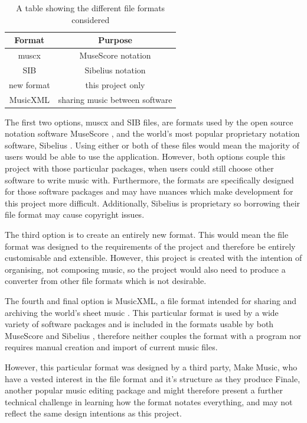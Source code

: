 \begin{table}[H]
\centering
\begin{tabular}{| c | c | } \hline
  {Format} & {Purpose} \\ \hline
  muscx & MuseScore notation \\ \hline
  SIB & Sibelius notation \\ \hline
  new format & this project only \\ \hline
  MusicXML & sharing music between software \\ \hline
\end{tabular}
\caption{A table showing the different file formats considered}
\label{table:formats}
\end{table}
The first two options, muscx and SIB files, are formats used by the open source notation software MuseScore \parencite{MuseTour}, and the world's most popular proprietary notation software, Sibelius \parencite{avid}. Using either or both of these files would mean the majority of users would be able to use the application. 
However, both options couple this project with those particular packages, when users could still choose other software to write music with. Furthermore, the formats are specifically designed for those software packages and may have nuances which make development for this project more difficult. Additionally, Sibelius is proprietary so borrowing their file format may cause copyright issues.

The third option is to create an entirely new format. This would mean the file format was designed to the requirements of the project and therefore be entirely customisable and extensible. However, this project is created with the intention of organising, not composing music, so the project would also need to produce a converter from other file formats which is not desirable.

The fourth and final option is MusicXML, a file format intended for sharing and archiving the world's sheet music \parencite{mxml}. This particular format is used by a wide variety of software packages \parencite{mxml} and is included in the formats usable by both MuseScore \parencite{MuseTour} and Sibelius \parencite{avid}, therefore neither couples the format with a program nor requires manual creation and import of current music files. 

However, this particular format was designed by a third party, Make Music, who have a vested interest in the file format and it's structure as they produce Finale, another popular music editing package\parencite{mxmlSoft} and might therefore present a further technical challenge in learning how the format notates everything, and may not reflect the same design intentions as this project.

